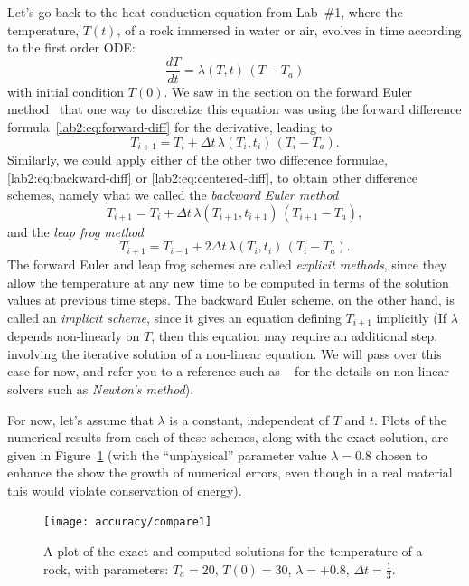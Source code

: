 \begin{example}
  \label{lab2:exm:accuracy}
  Let's go back to the heat conduction equation from Lab~\#1,
   where the temperature,
  $T(t)$, of a rock immersed in water or air, evolves in time
  according to the first order ODE: 
  \begin{equation}
    \frac{dT}{dt} = \lambda(T,t) \, (T-T_a) 
    \label{lab2:eq:conduction}
  \end{equation}
  with initial condition $T(0)$. 
  We saw in the section on the forward Euler
  method~ that one way to
  discretize this equation was using the forward difference
  formula~\eqref{lab2:eq:forward-diff}  
  for the derivative, leading to
  \[
  T_{i+1} = T_i + \Delta t \, \lambda(T_i,t_i) \, (T_i-T_a).
  \]
  Similarly, we could apply either of the other two difference
  formulae, \eqref{lab2:eq:backward-diff} or
  \eqref{lab2:eq:centered-diff}, to obtain other difference schemes,
  namely what we called the \emph{ backward Euler method}
  \[
  T_{i+1} = T_i + \Delta t \, \lambda(T_{i+1},t_{i+1}) \, (T_{i+1}-T_a), 
  \]
  and the \emph{ leap frog method}
  \[
  T_{i+1} = T_{i-1} + 2 \Delta t \, \lambda(T_{i},t_{i}) \, (T_{i}-T_a). 
  \]
  The forward Euler and leap frog schemes are called \emph{ explicit
    methods}, since they allow the temperature at any new time to be
  computed in terms of the solution values at previous time steps.
  The backward Euler scheme, on the other hand, is called an \emph{
    implicit scheme}, since it gives an equation defining $T_{i+1}$
  implicitly (If $\lambda$ depends non-linearly on $T$, then this
  equation may require an additional step, involving the iterative
  solution of a non-linear equation.  We will pass over this case for
  now, and refer you to a reference such as 
  ~\cite{burden-faires} for the details on non-linear solvers
  such as \emph{ Newton's method}).

  For now, let's assume that $\lambda$ is a constant, independent of
  $T$ and $t$.
  Plots of the numerical results from each of these
  schemes, along with the exact solution, are given in
  Figure~\ref{lab2:fig:compare} (with the ``unphysical'' parameter
  value $\lambda=0.8$ chosen to enhance the show the growth of
  numerical errors, even though in a real material this would
  violate conservation of energy).
  \begin{figure}[htbp]
    \begin{center}
      \leavevmode
      \texttt{[image: accuracy/compare1]}      
      \caption{A plot of the exact and computed solutions for the
        temperature of a rock, with parameters: $T_a=20$, $T(0)=30$, 
        $\lambda= +0.8$, $\Delta t=\frac{1}{3}$.}
      \label{lab2:fig:compare}
    \end{center}
  \end{figure}
  

\end{example}
